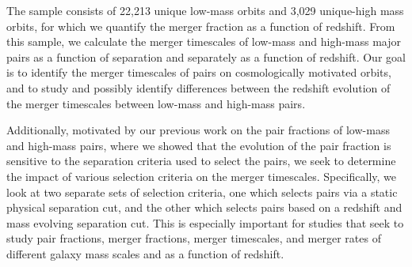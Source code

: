 \documentclass[twocolumn,linenumbers]{aastex631}
\begin{document}
    The sample consists of 22,213 unique low-mass orbits and 3,029 unique-high mass orbits, for which we quantify the merger fraction as a function of redshift.
    From this sample, we calculate the merger timescales of low-mass and high-mass major pairs as a function of separation and separately as a function of redshift. 
    Our goal is to identify the merger timescales of pairs on cosmologically motivated orbits, and to study and possibly identify differences between the redshift evolution of the merger timescales between low-mass and high-mass pairs. 
    
    Additionally, motivated by our previous work on the pair fractions of low-mass and high-mass pairs, where we showed that the evolution of the pair fraction is sensitive to the separation criteria used to select the pairs, we seek to determine the impact of various selection criteria on the merger timescales. 
    Specifically, we look at two separate sets of selection criteria, one which selects pairs via a static physical separation cut, and the other which selects pairs based on a redshift and mass evolving separation cut.
    This is especially important for studies that seek to study pair fractions, merger fractions, merger timescales, and merger rates of different galaxy mass scales and as a function of redshift. 
\end{document}
